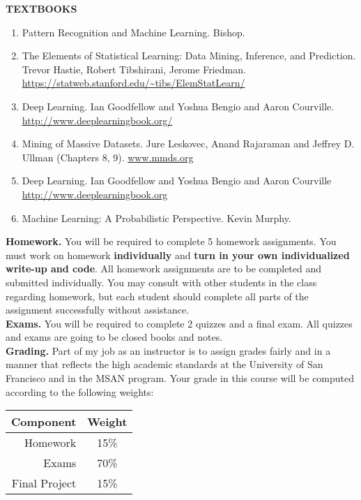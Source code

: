\documentclass[11pt]{article}
\begin{document}
\noindent \noindent \textbf{TEXTBOOKS} \\
\vspace{-0.05in}
\begin{enumerate}
\item Pattern Recognition and Machine Learning. Bishop. 
\item The Elements of Statistical Learning: Data Mining, Inference, and Prediction. Trevor Hastie, Robert Tibshirani, Jerome Friedman. \url{https://statweb.stanford.edu/~tibs/ElemStatLearn/} 
\item Deep Learning. Ian Goodfellow and Yoshua Bengio and Aaron Courville.  \url{http://www.deeplearningbook.org/}
\item Mining of Massive Datasets. Jure Leskovec, Anand Rajaraman and Jeffrey D. Ullman (Chapters 8, 9). \url{www.mmds.org}
\item Deep Learning. Ian Goodfellow and Yoshua Bengio and Aaron Courville \url{http://www.deeplearningbook.org}
\item Machine Learning: A Probabilistic Perspective. Kevin Murphy. 
\end{enumerate}

\noindent \textbf{Homework.} You will be required to complete 5 homework assignments. You must work on homework \textbf{individually} and \textbf{turn in your own individualized write-up and code}. All homework assignments are to be completed and submitted individually. You may consult with other students in the class regarding homework, but each student should complete all parts of the assignment successfully without assistance.\\

\noindent \textbf{Exams.} You will be required to complete 2 quizzes and a final exam.  All quizzes and exams are going to be closed books and notes.\\

\noindent \textbf{Grading.} Part of my job as an instructor is to assign grades fairly and in a manner that reflects the high academic standards at the University of San Francisco and in the MSAN program. Your grade in this course will be computed according to the following weights:\\

\vspace{-0.15in}

\begin{center}
\begin{tabular}{|r|c|}
  \hline
  \textbf{Component} & \textbf{Weight} \\
  \hline
  Homework & 15\%  \\
  Exams & 70\%  \\
  Final Project & 15\% \\
  \hline
\end{tabular}
\end{center}
\end{document}

